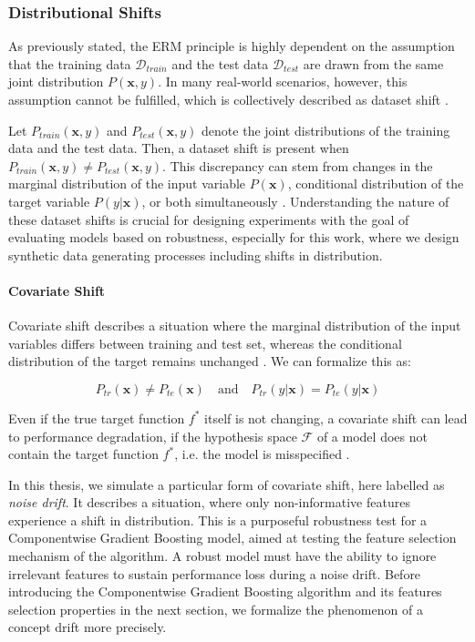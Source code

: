 \documentclass[fontsize=12 pt]{scrartcl}
\begin{document}
\subsubsection{Distributional Shifts}

As previously stated, the ERM principle is highly dependent on the assumption that the training data $\mathcal{D}_{train}$ and the test data $\mathcal{D}_{test}$ are drawn from the same joint distribution $P(\mathbf{x}, y)$. In many real-world scenarios, however, this assumption cannot be fulfilled, which is collectively described as dataset shift \citep{quionero2009dataset}.

Let $P_{train}(\mathbf{x}, y)$ and $P_{test}(\mathbf{x}, y)$ denote the joint distributions of the training data and the test data. Then, a dataset shift is present when $P_{train}(\mathbf{x}, y) \neq P_{test}(\mathbf{x}, y)$. This discrepancy can stem from changes in the marginal distribution of the input variable $P(\mathbf{x})$, conditional distribution of the target variable $P(y|\mathbf{x})$, or both simultaneously \citep{quionero2009dataset}. Understanding the nature of these dataset shifts is crucial for designing experiments with the goal of evaluating models based on robustness, especially for this work, where we design synthetic data generating processes including shifts in distribution.

\paragraph{Covariate Shift}

Covariate shift describes a situation where the marginal distribution of the input variables differs between training and test set, whereas the conditional distribution of the target remains unchanged \citep{shimodaira2000improving}. We can formalize this as:

\begin{equation}
    P_{tr}(\mathbf{x}) \neq P_{te}(\mathbf{x}) \quad \text{and} \quad P_{tr}(y|\mathbf{x}) = P_{te}(y|\mathbf{x})
\end{equation}

Even if the true target function $f^*$ itself is not changing, a covariate shift can lead to performance degradation, if the hypothesis space $\mathcal{F}$ of a model does not contain the target function $f^*$, i.e. the model is misspecified \citep{wen2014robust}.

In this thesis, we simulate a particular form of covariate shift, here labelled as \textit{noise drift}. It describes a situation, where only non-informative features experience a shift in distribution. This is a purposeful robustness test for a Componentwise Gradient Boosting model, aimed at testing the feature selection mechanism of the algorithm. A robust model must have the ability to ignore irrelevant features to sustain performance loss during a noise drift. Before introducing the Componentwise Gradient Boosting algorithm and its features selection properties in the next section, we formalize the phenomenon of a concept drift more precisely.
\end{document}
